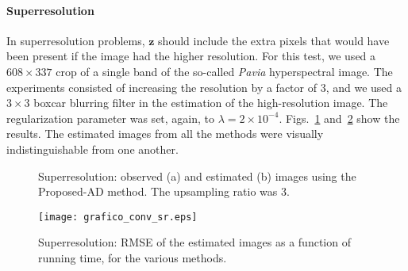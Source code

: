 \documentclass[10pt,twocolumn,twoside]{IEEEtran}
\newcommand{\z}{\mathbf{z}} %
\begin{document}
\paragraph{Superresolution} In superresolution problems, $\z$ should include the extra pixels that would have been present if the image had the higher resolution. For this test, we used a $608 \times 337$ crop of a single band of the so-called \emph{Pavia} hyperspectral image. The experiments consisted of increasing the resolution by a factor of 3, and we used a $3 \times 3$ boxcar blurring filter in the estimation of the high-resolution image. The regularization parameter was set, again, to $\lambda = 2 \times 10^{-4}$. Figs.~\ref{fig:pavia_sr} and~\ref{fig:grafico_conv_sr} show the results. The estimated images from all the methods were visually indistinguishable from one another.

\begin{figure}[!t]
	\centering
	\hfil
	\caption{Superresolution: observed (a) and estimated (b) images using the Proposed-AD method. The upsampling ratio was 3.}
	\label{fig:pavia_sr}
\end{figure}

\begin{figure}[!t]
	\centering
	\texttt{[image: grafico\_conv\_sr.eps]}%
	\caption{Superresolution: RMSE of the estimated images as a function of running time, for the various methods.}
	\label{fig:grafico_conv_sr}
\end{figure}
\end{document}

